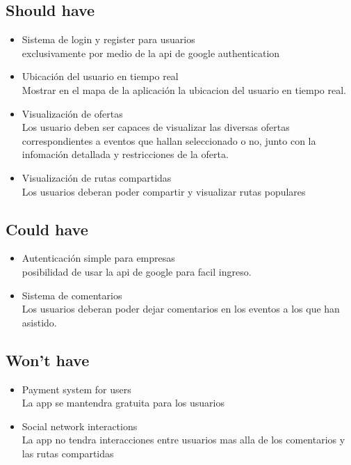 \documentclass[a4paper,12pt,oneside]{article}
\begin{document}
\subsection{Should have}
  \begin{itemize}
    \item Sistema de login y register para usuarios \\
      exclusivamente por medio de la api de google authentication
    \item Ubicación del usuario en tiempo real \\
      Mostrar en el mapa de la aplicación la ubicacion del usuario en tiempo real.
    \item Visualización de ofertas \\
      Los usuario deben ser capaces de visualizar las diversas ofertas correspondientes a eventos que hallan seleccionado o no, junto con la infomación detallada y restricciones de la oferta.
    \item Visualización de rutas compartidas \\
      Los usuarios deberan poder compartir y visualizar rutas populares
  \end{itemize}

\subsection{Could have}
  \begin{itemize}
    \item Autenticación simple para empresas \\
      posibilidad de usar la api de google para facil ingreso.
    \item Sistema de comentarios \\
      Los usuarios deberan poder dejar comentarios en los eventos a los que han asistido.
  \end{itemize}

\subsection{Won't have}
  \begin{itemize}
    \item Payment system for users \\
      La app se mantendra gratuita para los usuarios
    \item Social network interactions \\
      La app no tendra interacciones entre usuarios mas alla de los comentarios y las rutas compartidas

  \end{itemize}
\end{document}

